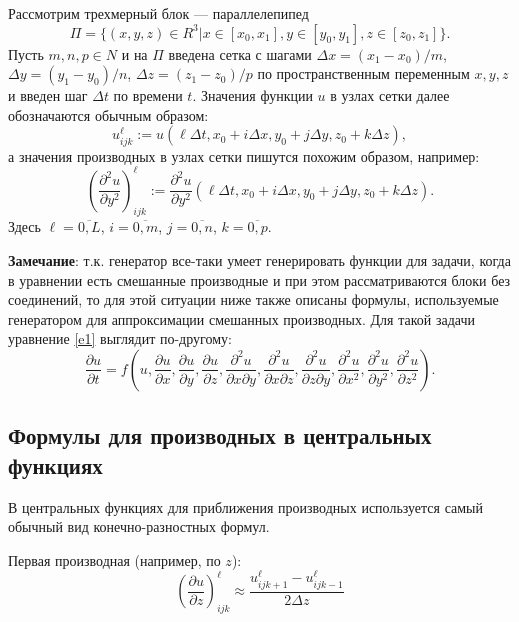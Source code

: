 \documentclass[a4paper]{article}
\begin{document}
Рассмотрим трехмерный блок --- параллелепипед
\begin{equation*}
\Pi = \{(x,y,z) \in R^3| x \in [x_0, x_1], y \in [y_0, y_1], z \in [z_0, z_1]\}.
\end{equation*}
Пусть $m,n,p\in N$ и на $\Pi$ введена сетка с шагами $\Delta x = (x_1-x_0)/m$, $\Delta y = (y_1-y_0)/n$, $\Delta z = (z_1-z_0)/p$ по про\-стран\-ствен\-ным переменным $x,y,z$ и введен шаг $\Delta t$ по времени $t$. Значения функции $u$ в узлах сетки далее обозначаются обычным образом:
\begin{equation*}
u^{\ell}_{ijk} := u(\ell\Delta t, x_0 + i\Delta x, y_0 + j\Delta y, z_0 + k\Delta z),
\end{equation*}
а значения производных в узлах сетки пишутся похожим образом, например:
\begin{equation*}
\left(\frac{\partial^2 u}{\partial y^2}\right)^{\ell}_{ijk} := \frac{\partial^2 u}{\partial y^2}(\ell\Delta t, x_0 + i\Delta x, y_0 + j\Delta y, z_0 + k\Delta z).
\end{equation*}
Здесь $\ell = \overline{0,L}$, $i = \overline{0,m}$, $j = \overline{0,n}$, $k = \overline{0,p}$.

{\bf Замечание}: т.к. генератор все-таки умеет генерировать функции для задачи, когда в уравнении есть смешанные производные и при этом рассматриваются блоки без соединений, то для этой ситуации ниже также описаны формулы, используемые генератором для аппроксимации смешанных производных. Для такой задачи урав\-не\-ние \eqref{e1} выглядит по-другому:
\begin{equation}\label{e2}
\frac{\partial u}{\partial t} = f\left(u, \frac{\partial u}{\partial x}, \frac{\partial u}{\partial y}, \frac{\partial u}{\partial z}, \frac{\partial^2 u}{\partial x\partial y}, \frac{\partial^2 u}{\partial x\partial z}, \frac{\partial^2 u}{\partial z\partial y}, \frac{\partial^2 u}{\partial x^2}, \frac{\partial^2 u}{\partial y^2}, \frac{\partial^2 u}{\partial z^2}\right).
\end{equation} 

\subsection{\Large Формулы для производных в центральных функциях}\label{s1}
В центральных функциях для приближения производных используется самый обычный вид конечно-разностных формул.

Первая производная (например, по $z$):
\begin{equation}\label{e3}
\left(\frac{\partial u}{\partial z}\right)^{\ell}_{ijk} \approx \frac{u^{\ell}_{ijk+1} - u^{\ell}_{ijk-1}}{2\Delta z}
\end{equation}
\end{document}

